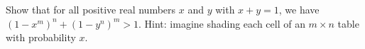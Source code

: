 Show that for all positive real numbers $x$ and $y$ with $x + y = 1$, we have $(1 - x^m)^n + (1 - y^n)^m > 1$. Hint: imagine shading each cell of an $m \times n$ table with probability $x$.
